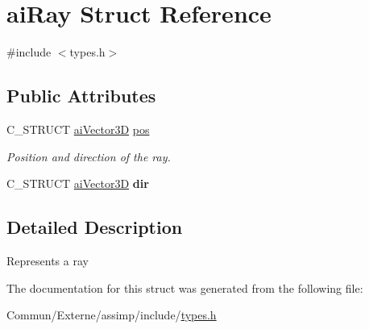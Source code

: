 \hypertarget{structai_ray}{}\section{ai\+Ray Struct Reference}
\label{structai_ray}


{\ttfamily \#include $<$types.\+h$>$}

\subsection*{Public Attributes}
\begin{DoxyCompactItemize}
\item 
C\+\_\+\+S\+T\+R\+U\+CT \hyperlink{structai_vector3_d}{ai\+Vector3D} \hyperlink{structai_ray_a312f663a7d2580b1b3beb52ffd4ab4c9}{pos}\hypertarget{structai_ray_a312f663a7d2580b1b3beb52ffd4ab4c9}{}\label{structai_ray_a312f663a7d2580b1b3beb52ffd4ab4c9}

\begin{DoxyCompactList}\small\item\em Position and direction of the ray. \end{DoxyCompactList}\item 
C\+\_\+\+S\+T\+R\+U\+CT \hyperlink{structai_vector3_d}{ai\+Vector3D} {\bfseries dir}\hypertarget{structai_ray_a635d9120af2654716e5e7952d837282b}{}\label{structai_ray_a635d9120af2654716e5e7952d837282b}

\end{DoxyCompactItemize}


\subsection{Detailed Description}
Represents a ray 

The documentation for this struct was generated from the following file\+:\begin{DoxyCompactItemize}
\item 
Commun/\+Externe/assimp/include/\hyperlink{types_8h}{types.\+h}\end{DoxyCompactItemize}

